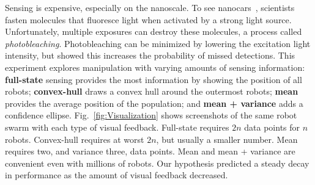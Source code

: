 Sensing is expensive, especially on the nanoscale. To see nanocars~\cite{Chiang2011}, scientists fasten molecules that fluoresce light when activated by a strong light source. Unfortunately, multiple exposures can destroy these molecules, a process called \emph{photobleaching}. Photobleaching can be minimized by lowering the excitation light intensity, but \cite{Cazes2001} showed this increases the probability of missed detections.  This experiment explores manipulation with varying amounts of sensing information: {\bf full-state} sensing provides the most information by showing the position of all robots; {\bf convex-hull} draws a convex hull around the outermost robots; {\bf mean} provides the average position of the population; and {\bf mean + variance} adds a confidence ellipse. Fig.~\ref{fig:Visualization} shows screenshots of the same robot swarm with each type of visual feedback. Full-state requires $2n$ data points for $n$ robots. Convex-hull requires at worst $2n$, but usually a smaller number.  Mean requires two, and variance three, data points.  Mean and mean + variance are convenient even with millions of robots. Our hypothesis predicted a steady decay in performance as the amount of visual feedback decreased.

%


